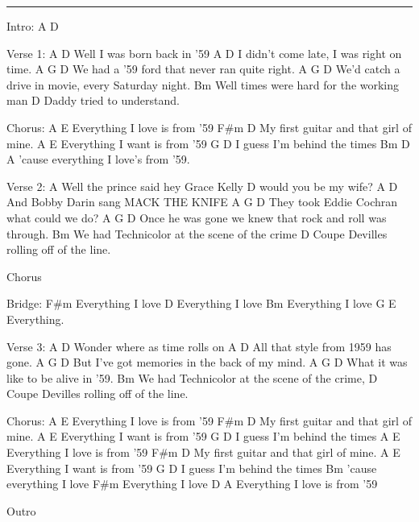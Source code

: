 \noindent\rule{\columnwidth}{1pt}

\begin{multicols}{2}
\begin{lstsong}
Intro: A  D

Verse 1:
A                       D
Well I was born back in '59
A                         D
I didn't come late, I was right on time.
A                G           D
We had a '59 ford that never ran quite right.
A                            G     D
We'd catch a drive in movie, every Saturday night.
Bm
Well times were hard for the working man
D
Daddy tried to understand.

Chorus:
A                         E
Everything I love is from '59
       F#m                D
My first guitar and that girl of mine.
A                         E
Everything I want is from '59
    G                  D
I guess I’m behind the times
       Bm           D               A
'cause everything I love's from '59.

Verse 2:
A
Well the prince said hey Grace Kelly
          D
would you be my wife?
    A                D
And Bobby Darin sang MACK THE KNIFE
A                      G     D
They took Eddie Cochran what could we do?
A                             G        D
Once he was gone we knew that rock and roll was through.
Bm
We had Technicolor at the scene of the crime
D
Coupe Devilles rolling off of the line.
 
Chorus

Bridge:
F#m
Everything I love
D
Everything I love
Bm
Everything I love
G    E
Everything.

Verse 3:
A               D
Wonder where as time rolls on
A                     D
All that style from 1959 has gone.
A                    G       D
But I've got memories in the back of my mind.
A                G               D
What it was like to be alive in '59.
Bm
We had Technicolor at the scene of the crime,
D
Coupe Devilles rolling off of the line.

Chorus:
A                          E
Everything I love is from '59
       F#m                         D
My first guitar and that girl of mine.
A                         E
Everything I want is from '59
    G                  D
I guess I’m behind the times
A                          E
Everything I love is from '59
       F#m                         D
My first guitar and that girl of mine.
A                         E
Everything I want is from '59
    G                  D
I guess I’m behind the times
       Bm
'cause everything I love
F#m
Everything I love
D                             A
Everything I love is from '59 

Outro
\end{lstsong}
\end{multicols}
\newpage

